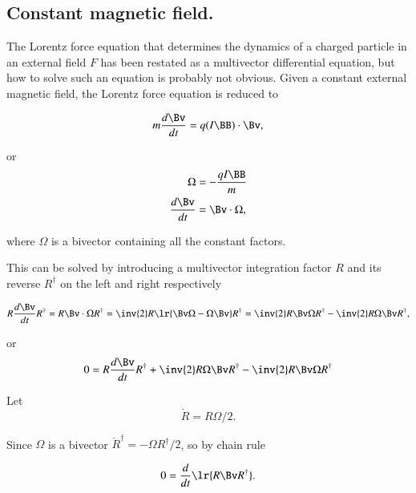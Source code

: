 \subsection{Constant magnetic field.}

The Lorentz force equation that determines the dynamics of a charged particle in an external field \( F \) has been restated as a multivector differential equation, but how to solve such an equation is probably not obvious.
Given a constant external magnetic field, the Lorentz force equation is reduced to

\begin{dmath}\label{eqn:lorentzForce:60}
m \frac{d\Bv}{dt} = q (I \BB) \cdot \Bv,
\end{dmath}

or
\begin{dmath}\label{eqn:lorentzForce:80}
\begin{aligned}
\Omega &= -\frac{q I \BB}{m} \\
\frac{d\Bv}{dt} &= \Bv \cdot \Omega,
\end{aligned}
\end{dmath}

where \( \Omega \) is a bivector containing all the constant factors.

This can be solved by introducing a multivector integration factor \( R \) and its reverse \( R^\dagger \) on the left and right respectively

\begin{dmath}\label{eqn:lorentzForce:100}
R \frac{d\Bv}{dt} R^\dagger
= R \Bv \cdot \Omega R^\dagger
= \inv{2} R \lr{ \Bv \Omega - \Omega \Bv} R^\dagger
= \inv{2} R \Bv \Omega R^\dagger - \inv{2} R \Omega \Bv R^\dagger,
\end{dmath}

or
\begin{dmath}\label{eqn:lorentzForce:120}
0 =
R \frac{d\Bv}{dt} R^\dagger
+ \inv{2} R \Omega \Bv R^\dagger
- \inv{2} R \Bv \Omega R^\dagger
\end{dmath}

Let
\begin{dmath}\label{eqn:lorentzForce:140}
\dot{R} = R \Omega/2.
\end{dmath}

Since \( \Omega \) is a bivector \( \dot{R}^\dagger = -\Omega R^\dagger/2 \), so by chain rule

\begin{dmath}\label{eqn:lorentzForce:160}
0
=
\frac{d}{dt} \lr{
R \Bv R^\dagger
}.
\end{dmath}

